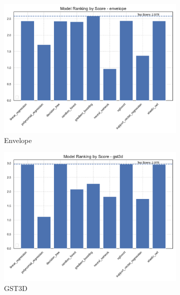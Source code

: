 \begin{figure}[htbp]
    \centering
    \begin{subfigure}[t]{0.32\textwidth}
        \includegraphics[width=\textwidth]{assets/images/05/score_by_model_envelope}
        \caption{Envelope}
    \end{subfigure}
    \hfill
    \begin{subfigure}[t]{0.32\textwidth}
        \includegraphics[width=\textwidth]{assets/images/05/score_by_model_gst3d}
        \caption{\ac{GST3D}}
    \end{subfigure}
    \hfill
    \begin{subfigure}[t]{0.32\textwidth}

\end{subfigure}
\end{figure}
